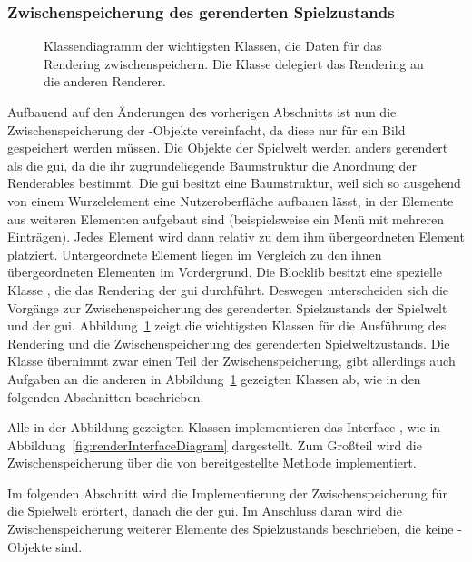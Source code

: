\subsubsection{Zwischenspeicherung des gerenderten Spielzustands}\label{sec:saveRenderState}
\begin{figure}
	\centering
	
	\caption[Klassendiagramm der wichtigsten Klassen, die Daten für das Rendering zwischenspeichern.]{Klassendiagramm der wichtigsten Klassen, die Daten für das Rendering zwischenspeichern. Die Klasse \classMasterRenderer{} delegiert das Rendering an die anderen Renderer.}\label{fig:renderDiagram}
\end{figure}
Aufbauend auf den Änderungen des vorherigen Abschnitts ist nun die Zwischenspeicherung der \classRenderable{}-Objekte vereinfacht, da diese nur für ein Bild gespeichert werden müssen. Die Objekte der Spielwelt werden anders gerendert als die \ac{gui}, da die ihr zugrundeliegende Baumstruktur die Anordnung der Renderables bestimmt. Die \ac{gui} besitzt eine Baumstruktur, weil sich so ausgehend von einem Wurzelelement eine Nutzeroberfläche aufbauen lässt, in der Elemente aus weiteren Elementen aufgebaut sind (beispielsweise ein Menü mit mehreren Einträgen). Jedes Element wird dann relativ zu dem ihm übergeordneten Element platziert. Untergeordnete Element liegen im Vergleich zu den ihnen übergeordneten Elementen im Vordergrund. Die Blocklib besitzt eine spezielle Klasse \classUIRenderer{}, die das Rendering der \ac{gui} durchführt. Deswegen unterscheiden sich die Vorgänge zur Zwischenspeicherung des gerenderten Spielzustands der Spielwelt und der \ac{gui}. Abbildung~\ref{fig:renderDiagram} zeigt die wichtigsten Klassen für die Ausführung des Rendering und die Zwischenspeicherung des gerenderten Spielweltzustands. Die Klasse \classMasterRenderer{} übernimmt zwar einen Teil der Zwischenspeicherung, gibt allerdings auch Aufgaben an die anderen in Abbildung~\ref{fig:renderDiagram} gezeigten Klassen ab, wie in den folgenden Abschnitten beschrieben.

Alle in der Abbildung gezeigten Klassen implementieren das Interface \classDoubleBuffer{}, wie in Abbildung~\ref{fig:renderInterfaceDiagram} dargestellt. Zum Großteil wird die Zwischenspeicherung über die von \classDoubleBuffer{} bereitgestellte Methode  implementiert.

Im folgenden Abschnitt wird die Implementierung der Zwischenspeicherung für die Spielwelt erörtert, danach die der \ac{gui}. Im Anschluss daran wird die Zwischenspeicherung weiterer Elemente des Spielzustands beschrieben, die keine \classRenderable{}-Objekte sind.

